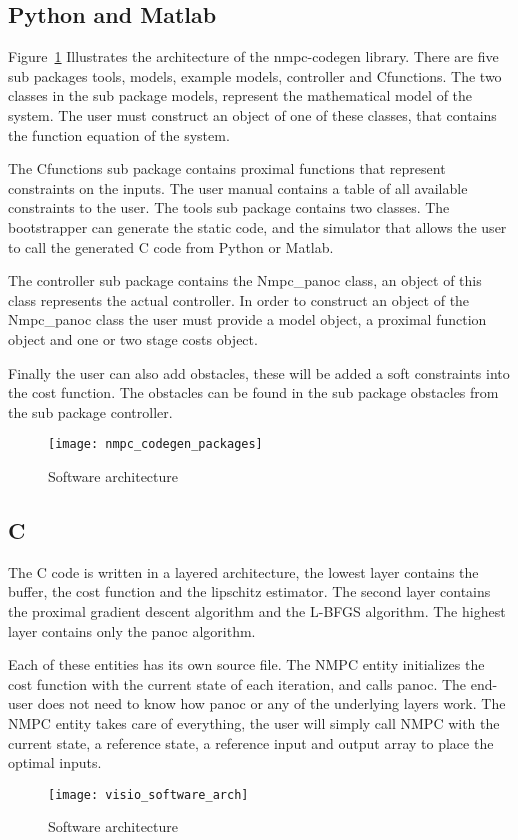 \subsection{Python and Matlab}
Figure~\ref{fig:nmpc_codegen_packages} Illustrates the architecture of the nmpc-codegen library. There are five sub packages tools, models, example models, controller and Cfunctions.  The two classes in the sub package models, represent the mathematical model of the system. The user must construct an object of one of these classes, that contains the function equation of the system.

The Cfunctions sub package contains proximal functions that represent constraints on the inputs. The user manual contains a table of all available constraints to the user. The tools sub package contains two classes. The bootstrapper can generate the static code, and the simulator that allows the user to call the generated C code from Python or Matlab.

The controller sub package contains the Nmpc\_panoc class, an object of this class represents the actual controller. In order to construct an object of the Nmpc\_panoc class the user must provide a model object, a proximal function object and one or two stage costs object.

Finally the user can also add obstacles, these will be added a soft constraints into the cost function. The obstacles can be found in the sub package obstacles from the sub package controller.
	\begin{figure}[H]
		\centering
		\texttt{[image: nmpc\_codegen\_packages]}
		\caption{Software architecture}
		\label{fig:nmpc_codegen_packages}
	\end{figure}

\subsection{C}
The C code is written in a layered architecture, the lowest layer contains the buffer, the cost function and the lipschitz estimator. The second layer contains the proximal gradient descent algorithm and the L-BFGS algorithm. The highest layer contains only the panoc algorithm.

Each of these entities has its own source file. The NMPC entity initializes the cost function with the current state of each iteration, and calls panoc. The end-user does not need to know how panoc or any of the underlying layers work. The NMPC entity takes care of everything, the user will simply call NMPC with the current state, a reference state, a reference input and output array to place the optimal inputs.
	\begin{figure}[H]
		\centering
		\texttt{[image: visio\_software\_arch]}
		\caption{Software architecture}
		\label{fig:visio software arch}
	\end{figure}
